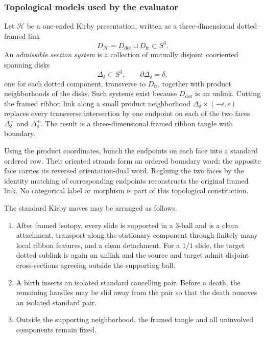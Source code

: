 \subsubsection{Topological models used by the evaluator}
\label{subsec:topological-evaluator-models}

\begin{definition}
\label{def:cut-open-dotted-tangle}
Let \(\mathcal H\) be a one-ended Kirby presentation, written as a
three-dimensional dotted--framed link
\[
  D_{\mathcal H}=D_{\mathrm{dot}}\sqcup D_{\mathrm{fr}}\subset S^3.
\]
An \emph{admissible section system} is a collection of mutually disjoint
cooriented spanning disks
\[
  \Delta_\delta\subset S^3,
  \qquad \partial\Delta_\delta=\delta,
\]
one for each dotted component, transverse to \(D_{\mathrm{fr}}\), together
with product neighborhoods of the disks.  Such systems exist because
\(D_{\mathrm{dot}}\) is an unlink.  Cutting the framed ribbon link along a
small product neighborhood
\(\Delta_\delta\times(-\epsilon,\epsilon)\) replaces every transverse
intersection by one endpoint on each of the two faces
\(\Delta_\delta^-\) and \(\Delta_\delta^+\).  The result is a
three-dimensional framed ribbon tangle with boundary.

Using the product coordinates, bunch the endpoints on each face into a
standard ordered row.  Their oriented strands form an ordered boundary word;
the opposite face carries its reversed orientation-dual word.  Regluing the
two faces by the identity matching of corresponding endpoints reconstructs
the original framed link.  No categorical label or morphism is part of this
topological construction.
\end{definition}

\begin{proposition}
\label{prop:local-movie-normal-forms}
The standard Kirby moves may be arranged as follows.
\begin{enumerate}[label=(\roman*),ref=\roman*]
  \item\label{item:slide-normal-form}
  After framed isotopy, every slide is supported in a \(3\)-ball and is a
  clean attachment, transport along the stationary component through
  finitely many local ribbon features, and a clean detachment.  For a
  \(1/1\) slide, the target dotted sublink is again an unlink and the source
  and target admit disjoint cross-sections agreeing outside the supporting
  ball.

  \item\label{item:cancellation-normal-form}
  A birth inserts an isolated standard cancelling pair.  Before a death,
  the remaining handles may be slid away from the pair so that the death
  removes an isolated standard pair.

  \item\label{item:fixed-exterior}
  Outside the supporting neighborhood, the framed tangle and all uninvolved
  components remain fixed.
\end{enumerate}
\end{proposition}

